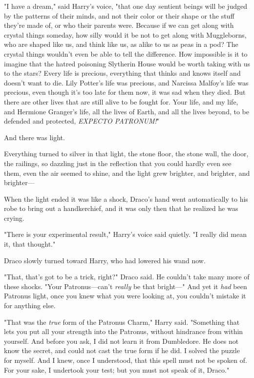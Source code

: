 "I have a dream," said Harry's voice, "that one day sentient beings will be
judged by the patterns of their minds, and not their color or their shape or
the stuff they're made of, or who their parents were. Because if we can get
along with crystal things someday, how silly would it be not to get along with
Muggleborns, who are shaped like us, and think like us, as alike to us as peas
in a pod? The crystal things wouldn't even be able to tell the difference. How
impossible is it to imagine that the hatred poisoning Slytherin House would be
worth taking with us to the stars? Every life is precious, everything that
thinks and knows itself and doesn't want to die. Lily Potter's life was
precious, and Narcissa Malfoy's life was precious, even though it's too late
for them now, it was sad when they died. But there are other lives that are
still alive to be fought for. Your life, and my life, and Hermione Granger's
life, all the lives of Earth, and all the lives beyond, to be defended and
protected, \emph{EXPECTO PATRONUM!}"

And there was light.

Everything turned to silver in that light, the stone floor, the stone wall, the
door, the railings, so dazzling just in the reflection that you could hardly
even see them, even the air seemed to shine, and the light grew brighter, and
brighter, and brighter---

When the light ended it was like a shock, Draco's hand went automatically to
his robe to bring out a handkerchief, and it was only then that he realized he
was crying.

"There is your experimental result," Harry's voice said quietly. "I really did
mean it, that thought."

Draco slowly turned toward Harry, who had lowered his wand now.

"That, that's got to be a trick, right?" Draco said. He couldn't take many more
of these shocks. "Your Patronus---can't \emph{really} be that bright\mbox{---}" And
yet it \emph{had} been Patronus light, once you knew what you were looking at,
you couldn't mistake it for anything else.

"That was the \emph{true} form of the Patronus Charm," Harry said. "Something
that lets you put all your strength into the Patronus, without hindrance from
within yourself. And before you ask, I did not learn it from Dumbledore. He
does not know the secret, and could not cast the true form if he did. I solved
the puzzle for myself. And I knew, once I understood, that this spell must not
be spoken of. For your sake, I undertook your test; but you must not speak of
it, Draco."

